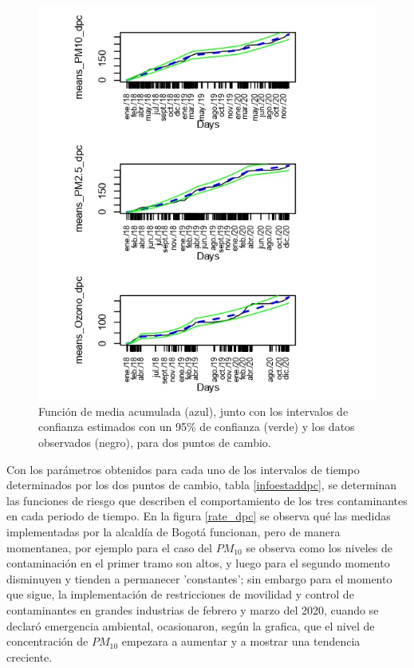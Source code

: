 \begin{figure}[h!]
\begin{center}
\includegraphics[width=12cm]{MEANSDPC}
\end{center}
\centering
\caption{ Función de media acumulada (azul), junto con los intervalos de confianza estimados con un 95\% de confianza (verde) y los datos observados (negro), para dos puntos de cambio.  }
\label{mediasacumdpc}
\end{figure}

Con los parámetros obtenidos para cada uno de los intervalos de tiempo determinados por los dos puntos de cambio, tabla \ref{infoestaddpc}, se determinan las funciones de riesgo que describen el comportamiento de los tres contaminantes en cada periodo de tiempo. 
En la figura \ref{rate_dpc} se observa qué las medidas implementadas por la alcaldía de Bogotá funcionan, pero de manera momentanea, por ejemplo para el caso del $PM_{10}$ se observa como los niveles de contaminación en el primer tramo son altos, y luego para el segundo momento disminuyen y tienden a permanecer 'constantes'; sin embargo para el momento que sigue, la implementación de restricciones de movilidad y control de contaminantes en grandes industrias de febrero y marzo del 2020, cuando se declaró emergencia ambiental, ocasionaron, según la grafica, que el nivel de concentración de $PM_{10}$ empezara a aumentar y a mostrar una tendencia creciente. 

